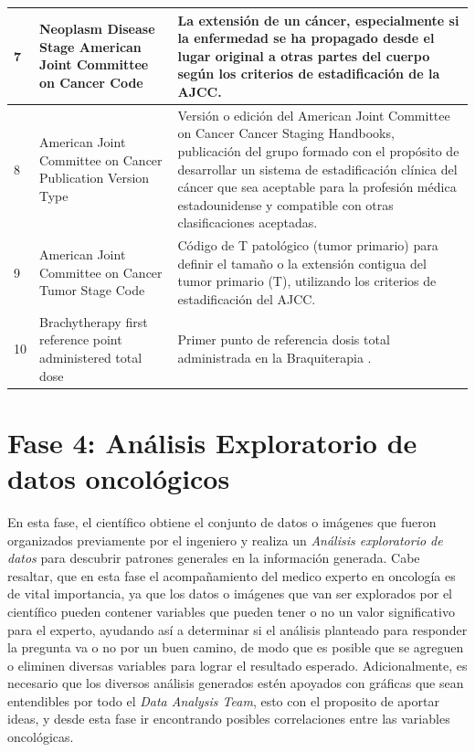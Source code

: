 \begin{table} [!htb]
\begin{threeparttable}
\begin{tabular}{p{1cm} p{4cm} p{10cm}}
			7
			&Neoplasm Disease Stage American Joint Committee on Cancer Code
			&La extensión de un cáncer, especialmente si la enfermedad se ha propagado desde el lugar original a otras partes del cuerpo según los criterios de estadificación de la AJCC.
			\\ \hline
			8
			&American Joint Committee on Cancer Publication Version Type
			&Versión o edición del American Joint Committee on Cancer Cancer Staging Handbooks, publicación del grupo formado con el propósito de desarrollar un sistema de estadificación clínica del cáncer que sea aceptable para la profesión médica estadounidense y compatible con otras clasificaciones aceptadas.
			\\ \hline
			9
			&American Joint Committee on Cancer Tumor Stage Code
			&Código de T patológico (tumor primario) para definir el tamaño o la extensión contigua del tumor primario (T), utilizando los criterios de estadificación del AJCC.
			\\ \hline
			10
			&Brachytherapy first reference point administered total dose
			&Primer punto de referencia dosis total administrada en la Braquiterapia .
			\\ \hline
		\end{tabular}
	\end{threeparttable}
\end{table}

\section{Fase 4: Análisis Exploratorio de datos oncológicos}

En esta fase, el científico obtiene el conjunto de datos o imágenes que fueron organizados previamente por el ingeniero y realiza un \textit{Análisis exploratorio de datos} para descubrir patrones generales en la información generada. Cabe resaltar, que en esta fase el acompañamiento del medico experto en oncología es de vital importancia, ya que los datos o imágenes que van ser explorados por el científico pueden contener variables que pueden tener o no un valor significativo para el experto, ayudando así a determinar si el análisis planteado para responder la pregunta va o no por un buen camino, de modo que es posible que se agreguen o eliminen diversas variables para lograr el resultado esperado. Adicionalmente, es necesario que los diversos análisis generados estén apoyados con gráficas que sean entendibles por todo el \textit{Data Analysis Team}, esto con el proposito de aportar ideas, y desde esta fase ir encontrando posibles correlaciones entre las variables oncológicas.

